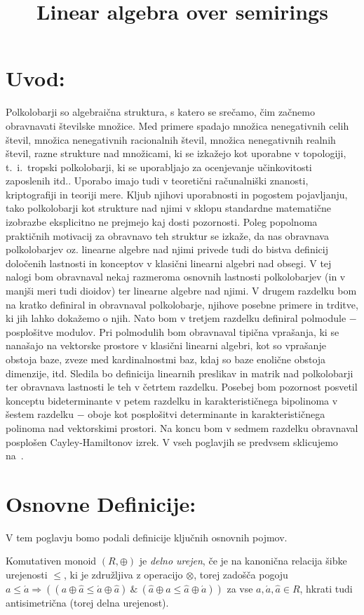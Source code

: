 \documentclass[mat1]{fmfdelo}
\title{Linear algebra over semirings}
\newcommand{\pojem}[1]{\emph{#1}}
\begin{document}
\section{Uvod:}

Polkolobarji so algebraična struktura, s katero se srečamo, čim začnemo obravnavati številske množice. Med primere spadajo množica nenegativnih celih števil, množica nenegativnih racionalnih števil, množica nenegativnih realnih števil, razne strukture nad množicami, ki se izkažejo kot uporabne v topologiji, t.\ i.\ tropski polkolobarji, ki se uporabljajo za ocenjevanje učinkovitosti zaposlenih itd.. Uporabo imajo tudi v teoretični računalniški znanosti, kriptografiji in teoriji mere. Kljub njihovi uporabnosti in pogostem pojavljanju, tako polkolobarji kot strukture nad njimi v sklopu standardne matematične izobrazbe eksplicitno ne prejmejo kaj dosti pozornosti. Poleg popolnoma praktičnih motivacij za obravnavo teh struktur se izkaže, da nas obravnava polkolobarjev oz. linearne algebre nad njimi privede tudi do bistva definicij določenih lastnosti in konceptov v klasični linearni algebri nad obsegi. V tej nalogi bom obravnaval nekaj razmeroma osnovnih lastnosti polkolobarjev (in v manjši meri tudi dioidov) ter linearne algebre nad njimi. V drugem razdelku bom na kratko definiral in obravnaval polkolobarje, njihove posebne primere in trditve, ki jih lahko dokažemo o njih. Nato bom v tretjem razdelku definiral polmodule $-$ posplošitve modulov. Pri polmodulih bom obravnaval tipična vprašanja, ki se nanašajo na vektorske prostore v klasični linearni algebri, kot so vprašanje obstoja baze, zveze med kardinalnostmi baz, kdaj so baze enolične obstoja dimenzije, itd. Sledila bo definicija linearnih preslikav in matrik nad polkolobarji ter obravnava lastnosti le teh v četrtem razdelku. Posebej bom pozornost posvetil konceptu bideterminante v petem razdelku in karakterističnega bipolinoma v šestem razdelku $-$ oboje kot posplošitvi determinante in karakterističnega polinoma nad vektorskimi prostori. Na koncu bom v sedmem razdelku obravnaval posplošen Cayley-Hamiltonov izrek. V vseh poglavjih se predvsem sklicujemo na~\cite{bib:Gondran}.

\section{Osnovne Definicije:}
V tem poglavju bomo podali definicije ključnih osnovnih pojmov.
\begin{definicija}
	Komutativen monoid $(R, \oplus)$ je \pojem{delno urejen}, če je na kanonična relacija šibke urejenosti $\leq$, ki je združljiva z operacijo $\otimes$, torej zadošča pogoju \\ 
	$a \leq \acute{a} \Rightarrow ((a \oplus \hat{a} \leq \acute{a} \oplus \hat{a})~\&~(\hat{a} \oplus a \leq \hat{a}\oplus \acute{a}))$ za vse $a, \acute{a},\hat{a}\in R$, hkrati tudi antisimetrična (torej delna urejenost).
\end{definicija}
\end{document}

